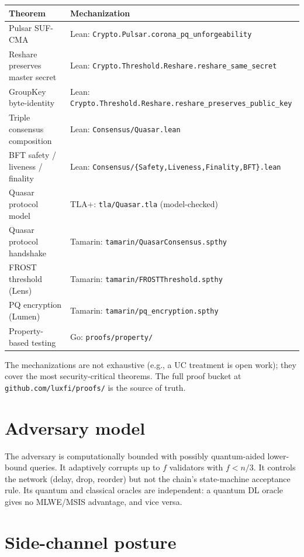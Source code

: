 \documentclass[11pt,a4paper]{article}
\begin{document}
\begin{tabular}{@{}p{}p{}@{}}
  \toprule
  \textbf{Theorem} & \textbf{Mechanization} \\
  \midrule
  Pulsar SUF-CMA & Lean: \texttt{Crypto.Pulsar.corona\_pq\_unforgeability} \\
  Reshare preserves master secret & Lean: \texttt{Crypto.Threshold.Reshare.reshare\_same\_secret} \\
  GroupKey byte-identity & Lean: \texttt{Crypto.Threshold.Reshare.reshare\_preserves\_public\_key} \\
  Triple consensus composition & Lean: \texttt{Consensus/Quasar.lean} \\
  BFT safety / liveness / finality & Lean: \texttt{Consensus/\{Safety,Liveness,Finality,BFT\}.lean} \\
  Quasar protocol model & TLA+: \texttt{tla/Quasar.tla} (model-checked) \\
  Quasar protocol handshake & Tamarin: \texttt{tamarin/QuasarConsensus.spthy} \\
  FROST threshold (Lens) & Tamarin: \texttt{tamarin/FROSTThreshold.spthy} \\
  PQ encryption (Lumen) & Tamarin: \texttt{tamarin/pq\_encryption.spthy} \\
  Property-based testing & Go: \texttt{proofs/property/} \\
  \bottomrule
\end{tabular}

The mechanizations are not exhaustive (e.g., a UC treatment is open work); they cover the most security-critical theorems. The full proof bucket at \texttt{github.com/luxfi/proofs/} is the source of truth.

\section{Adversary model}

The adversary is computationally bounded with possibly quantum-aided lower-bound queries. It adaptively corrupts up to $f$ validators with $f < n/3$. It controls the network (delay, drop, reorder) but not the chain's state-machine acceptance rule. Its quantum and classical oracles are independent: a quantum DL oracle gives no MLWE/MSIS advantage, and vice versa.

\section{Side-channel posture}
\end{document}
